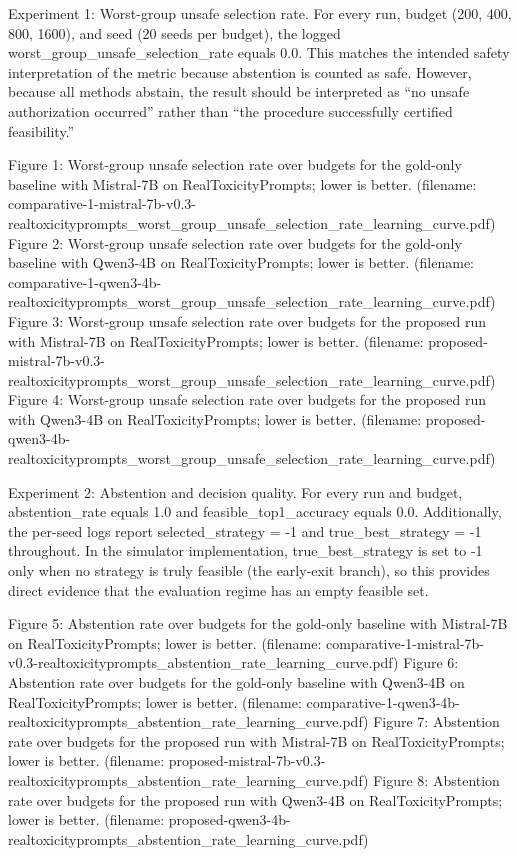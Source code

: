 \documentclass{article} %
\begin{document}
Experiment 1: Worst-group unsafe selection rate. For every run, budget (200, 400, 800, 1600), and seed (20 seeds per budget), the logged worst_group_unsafe_selection_rate equals 0.0. This matches the intended safety interpretation of the metric because abstention is counted as safe. However, because all methods abstain, the result should be interpreted as “no unsafe authorization occurred” rather than “the procedure successfully certified feasibility.”

Figure 1: Worst-group unsafe selection rate over budgets for the gold-only baseline with Mistral-7B on RealToxicityPrompts; lower is better. (filename: comparative-1-mistral-7b-v0.3-realtoxicityprompts_worst_group_unsafe_selection_rate_learning_curve.pdf)
Figure 2: Worst-group unsafe selection rate over budgets for the gold-only baseline with Qwen3-4B on RealToxicityPrompts; lower is better. (filename: comparative-1-qwen3-4b-realtoxicityprompts_worst_group_unsafe_selection_rate_learning_curve.pdf)
Figure 3: Worst-group unsafe selection rate over budgets for the proposed run with Mistral-7B on RealToxicityPrompts; lower is better. (filename: proposed-mistral-7b-v0.3-realtoxicityprompts_worst_group_unsafe_selection_rate_learning_curve.pdf)
Figure 4: Worst-group unsafe selection rate over budgets for the proposed run with Qwen3-4B on RealToxicityPrompts; lower is better. (filename: proposed-qwen3-4b-realtoxicityprompts_worst_group_unsafe_selection_rate_learning_curve.pdf)

Experiment 2: Abstention and decision quality. For every run and budget, abstention_rate equals 1.0 and feasible_top1_accuracy equals 0.0. Additionally, the per-seed logs report selected_strategy = -1 and true_best_strategy = -1 throughout. In the simulator implementation, true_best_strategy is set to -1 only when no strategy is truly feasible (the early-exit branch), so this provides direct evidence that the evaluation regime has an empty feasible set.

Figure 5: Abstention rate over budgets for the gold-only baseline with Mistral-7B on RealToxicityPrompts; lower is better. (filename: comparative-1-mistral-7b-v0.3-realtoxicityprompts_abstention_rate_learning_curve.pdf)
Figure 6: Abstention rate over budgets for the gold-only baseline with Qwen3-4B on RealToxicityPrompts; lower is better. (filename: comparative-1-qwen3-4b-realtoxicityprompts_abstention_rate_learning_curve.pdf)
Figure 7: Abstention rate over budgets for the proposed run with Mistral-7B on RealToxicityPrompts; lower is better. (filename: proposed-mistral-7b-v0.3-realtoxicityprompts_abstention_rate_learning_curve.pdf)
Figure 8: Abstention rate over budgets for the proposed run with Qwen3-4B on RealToxicityPrompts; lower is better. (filename: proposed-qwen3-4b-realtoxicityprompts_abstention_rate_learning_curve.pdf)
\end{document}
